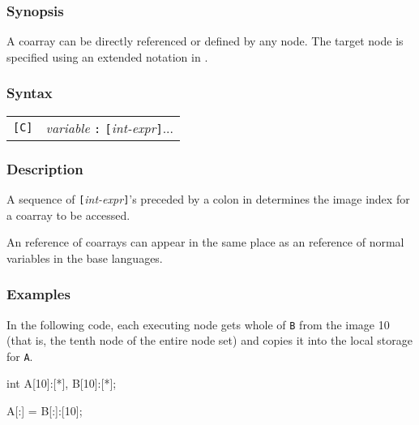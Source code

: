 \subsubsection*{Synopsis}
A coarray can be directly referenced or defined by any node. 
The target node is specified using an extended notation in {\XMPC}.

\subsubsection*{Syntax}

\begin{tabular}{ll}
\verb![C]! & {\it variable} {\tt :} {\tt [}{\it int-expr}{\tt ]}...\\
\end{tabular}

\subsubsection*{Description}

A sequence of {\tt [}{\it int-expr}{\tt ]}'s preceded by a colon in
{\XMPC} determines the image index for a coarray to be accessed.

An reference of coarrays can appear in the same place as an reference of
normal variables in the base languages.

\subsubsection*{Examples}

In the following code, each executing node gets whole of {\tt B} from
the image 10 (that is, the tenth node of the entire node set) and
copies it into the local storage for {\tt A}.

\vspace{0.3cm}

\begin{XCexample}
int A[10]:[*], B[10]:[*];

A[:] = B[:]:[10];
\end{XCexample}

